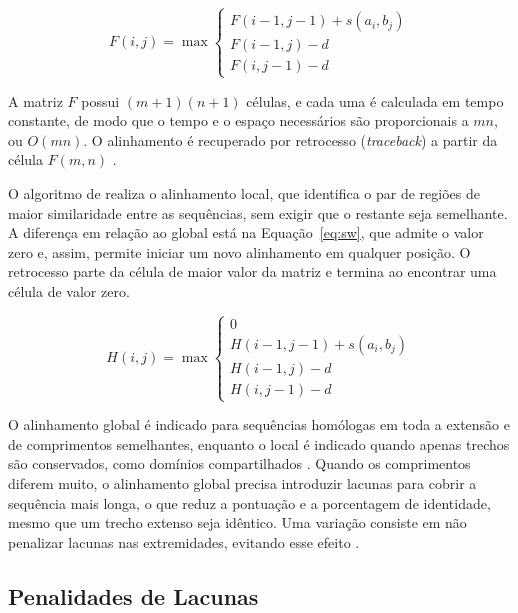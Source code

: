 \begin{equation}
	F(i,j) = \max
	\begin{cases}
		F(i-1,j-1) + s(a_i, b_j) \\
		F(i-1,j) - d \\
		F(i,j-1) - d
	\end{cases}
	\label{eq:nw}
\end{equation}

A matriz $F$ possui $(m+1)(n+1)$ células, e cada uma é calculada em tempo constante, de modo que o tempo e o espaço necessários são proporcionais a $mn$, ou $O(mn)$. O alinhamento é recuperado por retrocesso (\textit{traceback}) a partir da célula $F(m,n)$ \cite{Durbin1998}.

O algoritmo de  realiza o alinhamento local, que identifica o par de regiões de maior similaridade entre as sequências, sem exigir que o restante seja semelhante. A diferença em relação ao global está na Equação~\ref{eq:sw}, que admite o valor zero e, assim, permite iniciar um novo alinhamento em qualquer posição. O retrocesso parte da célula de maior valor da matriz e termina ao encontrar uma célula de valor zero.

\begin{equation}
	H(i,j) = \max
	\begin{cases}
		0 \\
		H(i-1,j-1) + s(a_i, b_j) \\
		H(i-1,j) - d \\
		H(i,j-1) - d
	\end{cases}
	\label{eq:sw}
\end{equation}

O alinhamento global é indicado para sequências homólogas em toda a extensão e de comprimentos semelhantes, enquanto o local é indicado quando apenas trechos são conservados, como domínios compartilhados \cite{Durbin1998}. Quando os comprimentos diferem muito, o alinhamento global precisa introduzir lacunas para cobrir a sequência mais longa, o que reduz a pontuação e a porcentagem de identidade, mesmo que um trecho extenso seja idêntico. Uma variação consiste em não penalizar lacunas nas extremidades, evitando esse efeito \cite{Durbin1998}.

\subsection{Penalidades de Lacunas}

